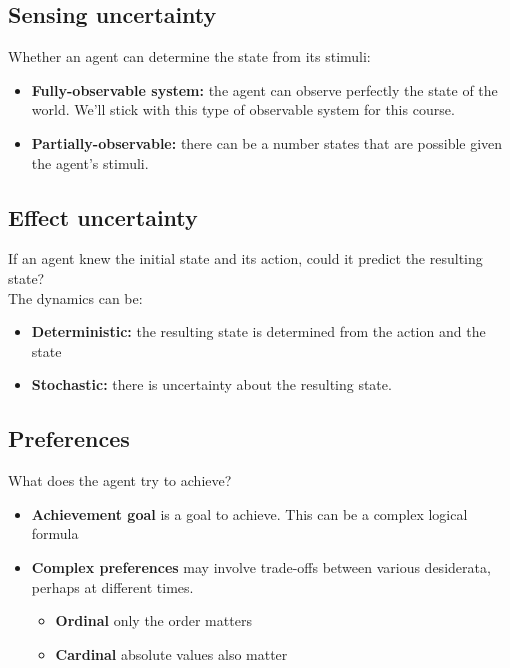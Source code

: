 \documentclass[12pt]{article}
\begin{document}
\subsection{Sensing uncertainty}
Whether an agent can determine the state from its stimuli:

\begin{itemize}
    \item \textbf{Fully-observable system:} the agent can observe perfectly the state of the world. We'll stick with this type of observable system for this course.    
    \item \textbf{Partially-observable:} there can be a number states that are possible given the agent’s
stimuli.
\end{itemize}

\subsection{Effect uncertainty}
If an agent knew the initial state and its action, could it predict the resulting state?\\

\noindent The dynamics can be:

\begin{itemize}
    \item \textbf{Deterministic:} the resulting state is determined from the action and the state
    \item \textbf{Stochastic:} there is uncertainty about the resulting state.
\end{itemize}

\subsection{Preferences}
What does the agent try to achieve?

\begin{itemize}
    \item \textbf{Achievement goal} is a goal to achieve. This can be a complex logical formula
    \item \textbf{Complex preferences} may involve trade-offs between various desiderata, perhaps at
different times.
    \begin{itemize}
        \item \textbf{Ordinal} only the order matters
        \item \textbf{Cardinal} absolute values also matter
    \end{itemize}
\end{itemize}
\end{document}
